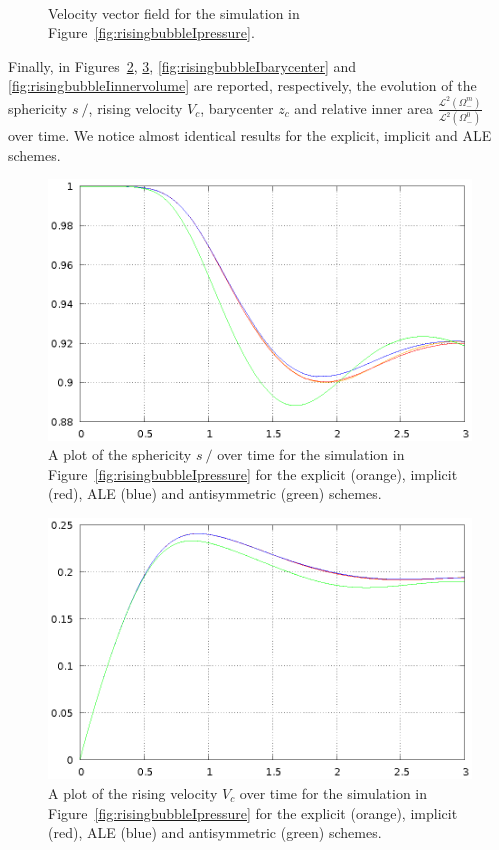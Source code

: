 \documentclass[a4paper,12pt,onecolumn]{article}
\newcommand{\strikes}{\mbox{$s\!\!\!\!\:/$}}
\begin{document}
\begin{figure}[htbp]
\centering
{}
\\
\caption[Navier--Stokes rising bubble I velocity]
{Velocity vector field for the simulation in
Figure~\ref{fig:risingbubbleIpressure}.}
\label{fig:risingbubbleIvelocity}
\end{figure}

Finally, in Figures~\ref{fig:risingbubbleIsphericity},
\ref{fig:risingbubbleIrisingvelocity}, \ref{fig:risingbubbleIbarycenter} and
\ref{fig:risingbubbleIinnervolume} are reported, respectively, the evolution of
the sphericity $\strikes$, rising velocity $V_c$, barycenter $z_c$ and relative
inner area $\frac{\mathcal{L}^2(\Omega^m_-)}{\mathcal{L}^2(\Omega^0_-)}$ over
time. We notice almost identical results for the explicit, implicit and ALE
schemes.
\begin{figure}[htbp]
\centering
\includegraphics[width=.45\textwidth]
{figures/rising_bubble_I_sphericity.ps}
\caption[Navier--Stokes rising bubble I sphericity]
{A plot of the sphericity $\strikes$ over time for the simulation in
Figure~\ref{fig:risingbubbleIpressure} for the explicit (orange), implicit
(red), ALE (blue) and antisymmetric (green) schemes.}
\label{fig:risingbubbleIsphericity}
\end{figure}

\begin{figure}[htbp]
\centering
\includegraphics[width=.45\textwidth]
{figures/rising_bubble_I_rising_velocity.ps}
\caption[Navier--Stokes rising bubble I rising velocity]
{A plot of the rising velocity $V_c$ over time for the simulation in
Figure~\ref{fig:risingbubbleIpressure} for the explicit (orange), implicit
(red), ALE (blue) and antisymmetric (green) schemes.}
\label{fig:risingbubbleIrisingvelocity}
\end{figure}
\end{document}
